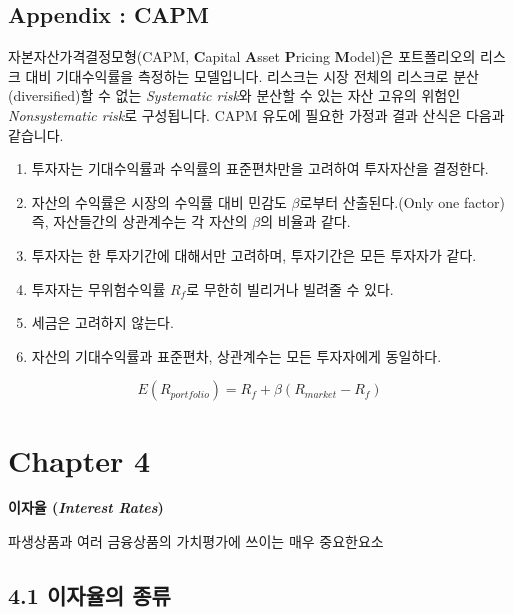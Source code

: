 \documentclass[
  letterpaper,
  DIV=11,
  numbers=noendperiod]{scrreprt}
\providecommand{\tightlist}{%
  \setlength{\itemsep}{0pt}\setlength{\parskip}{0pt}}\usepackage{longtable,booktabs,array}
\begin{document}
\section*{Appendix : CAPM}\label{sec-CAPM}


자본자산가격결정모형(CAPM, \textbf{C}apital \textbf{A}sset
\textbf{P}ricing \textbf{M}odel)은 포트폴리오의 리스크 대비 기대수익률을
측정하는 모델입니다. 리스크는 시장 전체의 리스크로 분산(diversified)할
수 없는 \emph{Systematic risk}와 분산할 수 있는 자산 고유의 위험인
\emph{Nonsystematic risk}로 구성됩니다. CAPM 유도에 필요한 가정과 결과
산식은 다음과 같습니다.

\begin{enumerate}
\def\labelenumi{\arabic{enumi}.}
\tightlist
\item
  투자자는 기대수익률과 수익률의 표준편차만을 고려하여 투자자산을
  결정한다.
\item
  자산의 수익률은 시장의 수익률 대비 민감도 \(\beta\)로부터
  산출된다.(Only one factor) 즉, 자산들간의 상관계수는 각 자산의
  \(\beta\)의 비율과 같다.
\item
  투자자는 한 투자기간에 대해서만 고려하며, 투자기간은 모든 투자자가
  같다.
\item
  투자자는 무위험수익률 \(R_f\)로 무한히 빌리거나 빌려줄 수 있다.
\item
  세금은 고려하지 않는다.
\item
  자산의 기대수익률과 표준편차, 상관계수는 모든 투자자에게 동일하다.
\end{enumerate}

\[E(R_{portfolio})=R_f+\beta(R_{market}-R_f)\]


\chapter*{Chapter 4}\label{chapter-4}


\textbf{이자율 (\emph{Interest Rates})}

파생상품과 여러 금융상품의 가치평가에 쓰이는 매우 중요한요소

\section*{4.1 이자율의
종류}\label{uxc774uxc790uxc728uxc758-uxc885uxb958}
\end{document}
